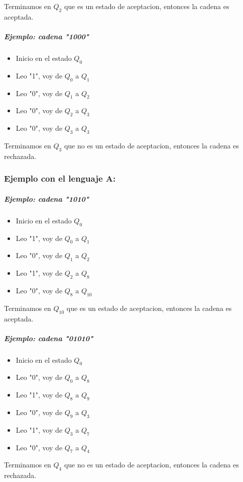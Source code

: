 \documentclass[a4paper, 12pt]{article}
\begin{document}
\space
    Terminamos en \( Q_2 \) que es un estado de aceptacion, entonces la cadena es aceptada.

\subparagraph{Ejemplo: cadena "1000"}
\begin{itemize}
    \item  Inicio en el estado \( Q_0 \)
    \item  Leo "1", voy de \( Q_0 \) a \( Q_1 \)
    \item  Leo "0", voy de \( Q_1 \) a \( Q_2 \)
    \item  Leo "0", voy de \( Q_2 \) a \( Q_3 \)
    \item  Leo "0", voy de \( Q_3 \) a \( Q_3 \)
\end{itemize}

\space
    Terminamos en \( Q_3 \) que no es un estado de aceptacion, entonces la cadena es rechazada.





\subsubsection*{Ejemplo con el lenguaje A:}
\subparagraph{Ejemplo: cadena "1010"}
\begin{itemize}
    \item  Inicio en el estado \( Q_0 \)
    \item  Leo "1", voy de \( Q_0 \) a \( Q_1 \)
    \item  Leo "0", voy de \( Q_1 \) a \( Q_2 \)
    \item  Leo "1", voy de \( Q_2 \) a \( Q_8 \)
    \item  Leo "0", voy de \( Q_8 \) a \( Q_{10} \)
\end{itemize}

\space
    Terminamos en \( Q_10 \) que es un estado de aceptacion, entonces la cadena es aceptada.

\subparagraph{Ejemplo: cadena "01010"}
\begin{itemize}
    \item  Inicio en el estado \( Q_0 \)
    \item  Leo "0", voy de \( Q_0 \) a \( Q_8 \)
    \item  Leo "1", voy de \( Q_8 \) a \( Q_9 \)
    \item  Leo "0", voy de \( Q_9 \) a \( Q_3 \)
    \item  Leo "1", voy de \( Q_3 \) a \( Q_7 \)
    \item  Leo "0", voy de \( Q_7 \) a \( Q_4 \)
\end{itemize}

\space
    Terminamos en \( Q_4 \) que no es un estado de aceptacion, entonces la cadena es rechazada.
\end{document}
